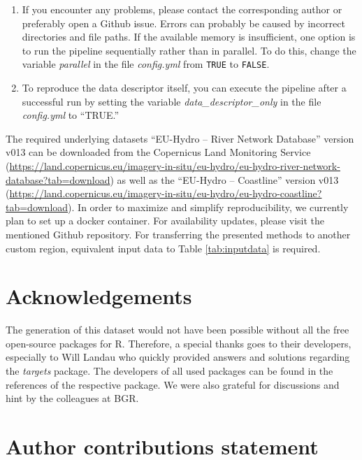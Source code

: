\documentclass[fleqn,10pt]{wlscirep}
\begin{document}
\normalsize

\begin{enumerate}
\def\labelenumi{\arabic{enumi}.}
\setcounter{enumi}{9}
\item
  If you encounter any problems, please contact the corresponding author or preferably open a Github issue. Errors can probably be caused by incorrect directories and file paths. If the available memory is insufficient, one option is to run the pipeline sequentially rather than in parallel. To do this, change the variable \emph{parallel} in the file \emph{config.yml} from \texttt{TRUE} to \texttt{FALSE}.
\item
  To reproduce the data descriptor itself, you can execute the pipeline after a successful run by setting the variable \emph{data\_descriptor\_only} in the file \emph{config.yml} to ``TRUE.''
\end{enumerate}

The required underlying datasets ``EU-Hydro -- River Network Database''\cite{noauthor_eu-hydro_2021} version v013 can be downloaded from the Copernicus Land Monitoring Service (\url{https://land.copernicus.eu/imagery-in-situ/eu-hydro/eu-hydro-river-network-database?tab=download}) as well as the ``EU-Hydro -- Coastline''\cite{noauthor_eu-hydro_2021-1} version v013 (\url{https://land.copernicus.eu/imagery-in-situ/eu-hydro/eu-hydro-coastline?tab=download}).
In order to maximize and simplify reproducibility, we currently plan to set up a docker container. For availability updates, please visit the mentioned Github repository.
For transferring the presented methods to another custom region, equivalent input data to Table \ref{tab:inputdata} is required.

\hypertarget{acknowledgements}{%
\section*{Acknowledgements}\label{acknowledgements}}

The generation of this dataset would not have been possible without all the free open-source packages for R. Therefore, a special thanks goes to their developers, especially to Will Landau who quickly provided answers and solutions regarding the \emph{targets} package. The developers of all used packages can be found in the references of the respective package. We were also grateful for discussions and hint by the colleagues at BGR.

\hypertarget{author-contributions-statement}{%
\section*{Author contributions statement}\label{author-contributions-statement}}
\end{document}
